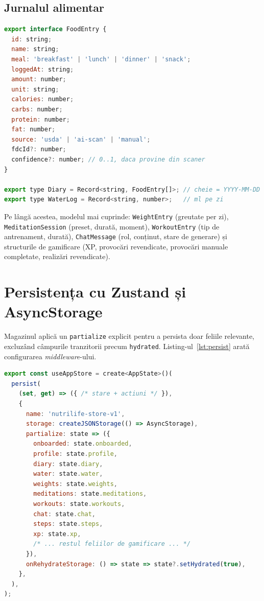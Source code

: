 \documentclass[12pt, a4paper, twoside]{report}
\numberwithin{equation}{section}
\begin{document}
\subsection{Jurnalul alimentar}

\begin{lstlisting}[language=JavaScript, caption={Intrarea de jurnal și jurnalul zilnic}]
export interface FoodEntry {
  id: string;
  name: string;
  meal: 'breakfast' | 'lunch' | 'dinner' | 'snack';
  loggedAt: string;
  amount: number;
  unit: string;
  calories: number;
  carbs: number;
  protein: number;
  fat: number;
  source: 'usda' | 'ai-scan' | 'manual';
  fdcId?: number;
  confidence?: number; // 0..1, daca provine din scaner
}

export type Diary = Record<string, FoodEntry[]>; // cheie = YYYY-MM-DD
export type WaterLog = Record<string, number>;   // ml pe zi
\end{lstlisting}

Pe lângă acestea, modelul mai cuprinde: \texttt{WeightEntry} (greutate per zi),
\texttt{MeditationSession} (preset, durată, moment), \texttt{WorkoutEntry} (tip de
antrenament, durată), \texttt{ChatMessage} (rol, conținut, stare de generare) și
structurile de gamificare (XP, provocări revendicate, provocări manuale completate,
realizări revendicate).

\section{Persistența cu Zustand și AsyncStorage}

Magazinul aplică un \texttt{partialize} explicit pentru a persista doar feliile relevante,
excluzând câmpurile tranzitorii precum \texttt{hydrated}. Listing-ul~\ref{lst:persist}
arată configurarea \textit{middleware}-ului.

\begin{lstlisting}[language=JavaScript, caption={Configurarea persistenței}, label={lst:persist}]
export const useAppStore = create<AppState>()(
  persist(
    (set, get) => ({ /* stare + actiuni */ }),
    {
      name: 'nutrilife-store-v1',
      storage: createJSONStorage(() => AsyncStorage),
      partialize: state => ({
        onboarded: state.onboarded,
        profile: state.profile,
        diary: state.diary,
        water: state.water,
        weights: state.weights,
        meditations: state.meditations,
        workouts: state.workouts,
        chat: state.chat,
        steps: state.steps,
        xp: state.xp,
        /* ... restul feliilor de gamificare ... */
      }),
      onRehydrateStorage: () => state => state?.setHydrated(true),
    },
  ),
);
\end{lstlisting}
\end{document}
